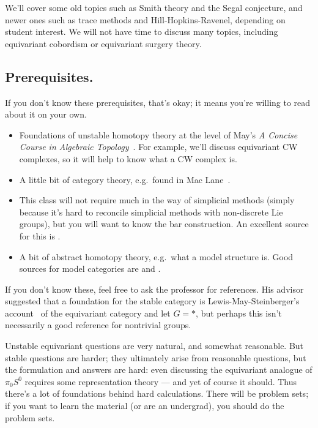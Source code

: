 We'll cover some old topics such as Smith theory and the Segal conjecture, and newer ones such as trace methods
and Hill-Hopkins-Ravenel, depending on student interest. We will not have time to discuss many topics, including
equivariant cobordism or equivariant surgery theory.
\subsection*{Prerequisites.} If you don't know these prerequisites, that's okay; it means you're willing to read
about it on your own.
\begin{itemize}
	\item Foundations of unstable homotopy theory at the level of May's \textit{A Concise Course in Algebraic
	Topology}~\cite{ConciseCourse}. For example, we'll discuss equivariant CW complexes, so it will help to know
	what a CW complex is.
	\item A little bit of category theory, e.g.\ found in Mac Lane~\cite{MacLane}.
	\item This class will not require much in the way of simplicial methods (simply because it's hard to reconcile
	simplicial methods with non-discrete Lie groups), but you will want to know the bar construction. An excellent source for this is \cite[Chapter 4]{RiehlCHT}.
	\item A bit of abstract homotopy theory, e.g.\ what a model structure is. Good sources for model categories are \cite[Part III]{RiehlCHT} and \cite{Hovey}.
\end{itemize}
If you don't know these, feel free to ask the professor for references. His advisor suggested that a foundation for
the stable category is Lewis-May-Steinberger's account~\cite{LMS} of the equivariant category and let $G = *$, but
perhaps this isn't necessarily a good reference for nontrivial groups.

Unstable equivariant questions are very natural, and somewhat reasonable. But stable questions are harder; they
ultimately arise from reasonable questions, but the formulation and answers are hard: even discussing the
equivariant analogue of $\pi_0S^0$ requires some representation theory --- and yet of course it should. Thus
there's a lot of foundations behind hard calculations. There will be problem sets; if you want to learn the
material (or are an undergrad), you should do the problem sets.
